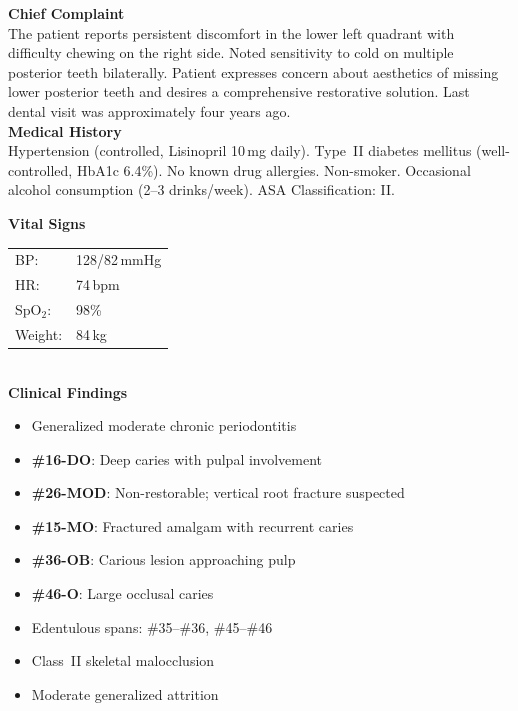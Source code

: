 \documentclass[11pt,a4paper]{article}
\begin{document}
\vspace{3mm}

\begin{minipage}[t]{0.55\textwidth}
  {\bfseries\color{primary}\Large Chief Complaint}\\[2mm]
  The patient reports persistent discomfort in the lower left quadrant with difficulty chewing on the right side. Noted sensitivity to cold on multiple posterior teeth bilaterally. Patient expresses concern about aesthetics of missing lower posterior teeth and desires a comprehensive restorative solution. Last dental visit was approximately four years ago.\\
  \vspace{2mm}
  {\bfseries\color{primary}Medical History}\\[2mm]
  Hypertension (controlled, Lisinopril 10\,mg daily). Type\ II diabetes mellitus (well-controlled, HbA1c 6.4\%). No known drug allergies. Non-smoker. Occasional alcohol consumption (2--3 drinks/week). ASA Classification: II.
\end{minipage}\hfill%
\begin{minipage}[t]{0.42\textwidth}
  {\bfseries\color{primary}Vital Signs}\\[2mm]
  \begin{tabular}{@{}p{2.5cm} p{2.2cm}@{}}
    BP: & 128/82\,mmHg\\
    HR: & 74\,bpm\\
    SpO$_2$: & 98\%\\
    Weight: & 84\,kg\\
  \end{tabular}\\[3mm]
  {\bfseries\color{primary}Clinical Findings}\\[2mm]
  \begin{itemize}[nosep, leftmargin=*, itemsep=0pt]
    \item Generalized moderate chronic periodontitis
    \item \textbf{\#16-DO}: Deep caries with pulpal involvement
    \item \textbf{\#26-MOD}: Non-restorable; vertical root fracture suspected
    \item \textbf{\#15-MO}: Fractured amalgam with recurrent caries
    \item \textbf{\#36-OB}: Carious lesion approaching pulp
    \item \textbf{\#46-O}: Large occlusal caries
    \item Edentulous spans: \#35--\#36, \#45--\#46
    \item Class\ II skeletal malocclusion
    \item Moderate generalized attrition
  \end{itemize}
\end{minipage}
\end{document}
